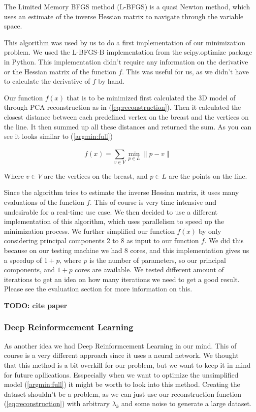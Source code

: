 The Limited Memory BFGS method (L-BFGS) is a quasi Newton method, which uses an estimate of the inverse Hessian matrix to navigate through the variable space. 

This algorithm was used by us to do a first implementation of our minimization problem. We used the L-BFGS-B implementation from the scipy.optimize package in Python. This implementation didn't require any information on the derivative
or the Hessian matrix of the function $f$. This was useful for us, as we didn't have to calculate the derivative of $f$ by hand. 

Our function $f(x)$ that is to be minimized first calculated the 3D model of through PCA reconstruction as in (\ref{eq:reconstruction}). Then it calculated the closest distance between each predefined vertex on the breast and the 
vertices on the line. It then summed up all these distances and returned the sum. As you can see it looks similar to (\ref{argmin:full})

\[
    f(x) = \sum_{v \in V}^{} \min_{p \in L} \lVert p - v \rVert
\]

Where $v \in V$ are the vertices on the breast, and $p \in L$ are the points on the line.

Since the algorithm tries to estimate the inverse Hessian matrix, it uses many evaluations of the function $f$. This of course is very time intensive and undesirable for a real-time use case. We then decided to use a different 
implementation of this algorithm, which uses parallelism to speed up the minimization process. We further simplified our function $f(x)$ by only considering principal components 2 to 8 as input to our function $f$. We did this because
on our testing machine we had 8 cores, and this implementation gives us a speedup of $1+p$, where $p$ is the number of parameters, so our principal components, and $1+p$ cores are available. We tested different amount of iterations to get an 
idea on how many iterations we need to get a good result. Please see the evaluation section for more information on this.

\textbf{TODO: cite paper}

\subsubsection{Deep Reinformcement Learning}

As another idea we had Deep Reinformcement Learning in our mind. This of course is a very different approach since it uses a neural network. We thought that this method is a bit overkill for our problem, but we want to keep it in mind
for future apllications. Esspecially when we want to optimize the unsimplified model (\ref{argmin:full}) it might be worth to look into this method. Creating the dataset shouldn't be a problem, as we can
just use our reconstruction function (\ref{eq:reconstruction}) with arbitrary $\lambda_k$ and some noise to generate a large dataset.



